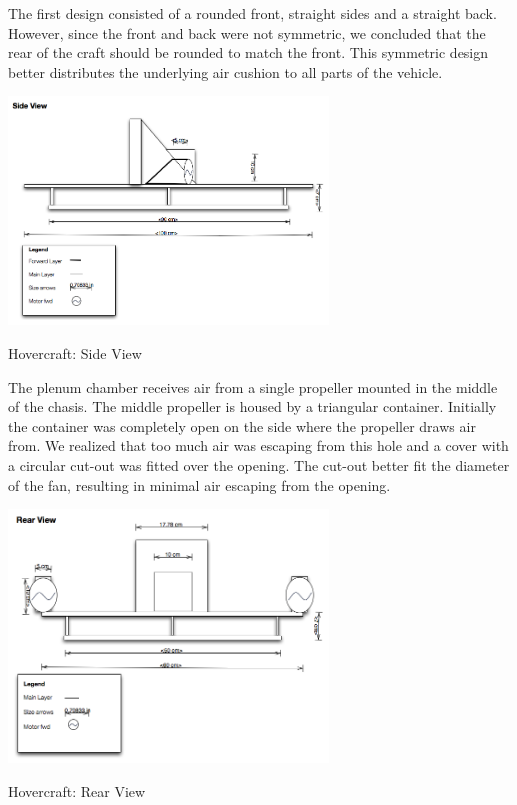 The first design consisted of a rounded front, straight sides and a straight back. However, since the front and back were not symmetric, we concluded that the rear of the craft should be rounded to match the front. This symmetric design better distributes the underlying air cushion to all parts of the vehicle.

  \begin{center}
    \includegraphics[width=85mm]{imageSources/sideView.png}
  \end{center}
  \caption{Hovercraft: Side View} 
  \label{sideView}

The plenum chamber receives air from a single propeller mounted in the middle of the chasis. The middle propeller is housed by a triangular container. Initially the container was completely open on the side where the propeller draws air from. We realized that too much air was escaping from this hole and a cover with a circular cut-out was fitted over the opening. The cut-out better fit the diameter of the fan, resulting in minimal air escaping from the opening.


  \begin{center}
    \includegraphics[width=85mm]{imageSources/rearView.png}
  \end{center}
  \caption{Hovercraft: Rear View} 
  \label{rearView}


